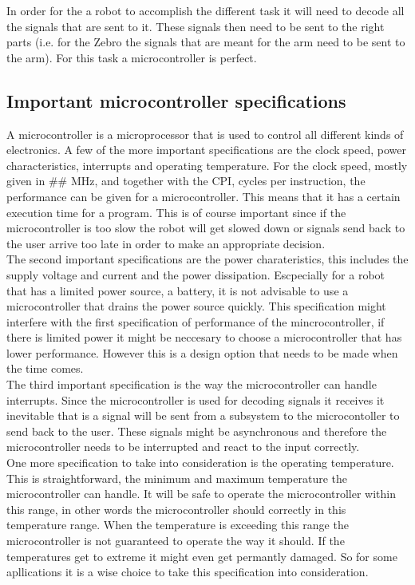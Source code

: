 \documentclass{article}
\begin{document}
In order for the a robot to accomplish the different task it will need to decode all the signals that are sent to it. These signals then need to be sent to the right parts (i.e. for the Zebro the signals that are meant for the arm need to be sent to the arm). For this task a microcontroller is perfect.

\subsection{Important microcontroller specifications}

A microcontroller is a microprocessor that is used to control all different kinds of electronics. A few of the more important specifications are the clock speed, power characteristics, interrupts and operating temperature. For the clock speed, mostly given in \#\# MHz, and together with the CPI, cycles per instruction, the performance can be given for a microcontroller. This means that it has a certain execution time for a program. This is of course important since if the microcontroller is too slow the robot will get slowed down or signals send back to the user arrive too late in order to make an appropriate decision. \\
The second important specifications are the power charateristics, this includes the supply voltage and current and the power dissipation. Escpecially for a robot that has a limited power source, a battery, it is not advisable to use a microcontroller that drains the power source quickly. This specification might interfere with the first specification of performance of the mincrocontroller, if there is limited power it might be neccesary to choose a microcontroller that has lower performance. However this is a design option that needs to be made when the time comes.\\
The third important specification is the way the microcontroller can handle interrupts. Since the microcontroller is used for decoding signals it receives it inevitable that is a signal will be sent from a subsystem to the microcontoller to send back to the user. These signals might  be asynchronous and therefore the microcontroller needs to be interrupted and react to the input correctly.\\
One more specification to take into consideration is the operating temperature. This is straightforward, the minimum and maximum temperature the microcontroller can handle. It will be safe to operate the microcontroller within this range, in other words the microcontroller should correctly in this temperature range. When the temperature is exceeding this range the microcontroller is not guaranteed to operate the way it should. If the temperatures get to extreme it might even get permantly damaged. So for some apllications it is a wise choice to take this specification into consideration.\\
\end{document}
